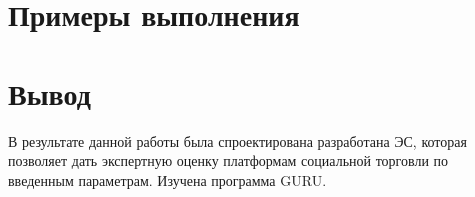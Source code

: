 %	
	
	\newpage
	\section{Примеры выполнения}
%		
	
	\section{Вывод}
		В результате данной работы была спроектирована разработана ЭС, которая позволяет дать экспертную оценку платформам социальной торговли по введенным параметрам. Изучена программа GURU.